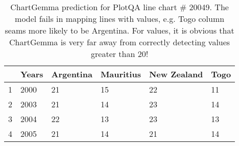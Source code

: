 \begin{table}
    \begin{tabular}{llllll}
\toprule
 & Years  & Argentina  & Mauritius  & New Zealand  & Togo  \\
\midrule
1 & 2000  & 21  & 15  & 22  & 11  \\
2 & 2003  & 21  & 14  & 23  & 14  \\
3 & 2004  & 22  & 13  & 23  & 13  \\
4 & 2005  & 21  & 14  & 21  & 14  \\
\bottomrule
\end{tabular}
    \caption{ChartGemma prediction for PlotQA line chart \# 20049. The model fails in mapping lines with values, e.g. Togo column seams more likely to be Argentina. For values, it is obvious that ChartGemma is very far away from correctly detecting values greater than 20!}
    \label{tab:chartgemma-plotqa-line-20049}
\end{table}
